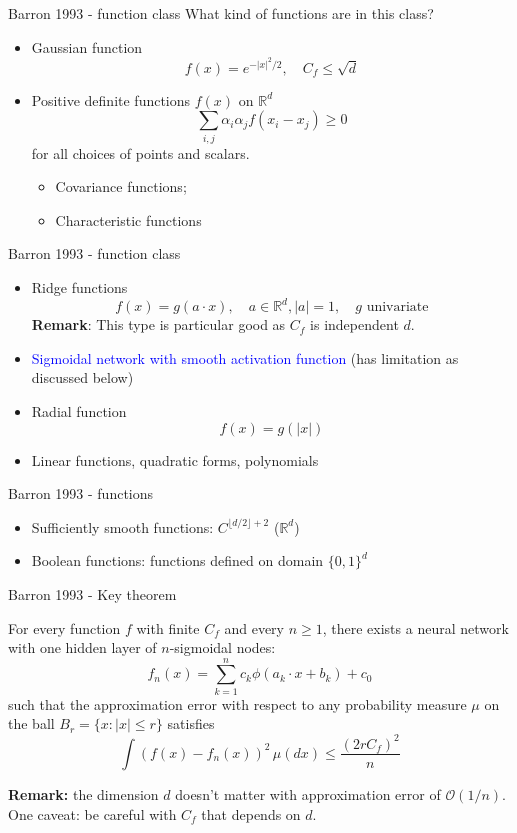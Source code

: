 \documentclass[aspectratio=169]{beamer} %
\begin{document}
\begin{frame}{Barron 1993 - function class}
What kind of functions are in this class?
\begin{itemize}
    \item Gaussian function
    $$
    f(x) = e^{-|x|^2/2},\quad C_f\le \sqrt{d}
    $$
    \item Positive definite functions $f(x)$ on $\mathbb{R}^d$
    $$
    \sum_{i,j} \alpha_i\alpha_j f(x_i-x_j)\ge 0
    $$
    for all choices of points and scalars.
    \begin{itemize}
        \item Covariance functions; 
        \item Characteristic functions
    \end{itemize}
    
\end{itemize}
\end{frame}
\begin{frame}{Barron 1993 - function class}
\begin{itemize}
    \item Ridge functions
    $$
    f(x) = g(a\cdot x),\quad a\in\mathbb{R}^d, |a|=1, \quad g\text{ univariate}
    $$
    \textbf{Remark}: This type is particular good as $C_f$ is independent $d$.
    \item \textcolor{blue}{Sigmoidal network with smooth activation function} (has limitation as discussed below)
    \item Radial function
    $$
    f(x) = g(|x|)
    $$
    \item Linear functions, quadratic forms, polynomials
\end{itemize}
\end{frame}
\begin{frame}{Barron 1993 - functions}
\begin{itemize}
    \item Sufficiently smooth functions: $C^{\lfloor d/2\rfloor+2}$ ($\mathbb{R}^d$)
    \item Boolean functions: functions defined on domain $\{0,1\}^d$
\end{itemize}
    
\end{frame}
\begin{frame}{Barron 1993 - Key theorem}
\begin{theorem}
    For every function $f$ with finite $C_f$ and every $n\ge 1$, there exists a neural network with one hidden layer of $n$-sigmoidal nodes:
    $$
    f_n(x) = \sum_{k=1}^n c_k\phi(a_k \cdot x + b_k)+c_0
    $$
    such that the approximation error with respect to any probability measure $\mu$ on the ball $B_r = \{x: |x|\le r\}$ satisfies
    $$
    \int (f(x)-f_n(x))^2 \, \mu(dx) \le \frac{(2rC_f)^2}{n}
    $$
\end{theorem}
\textbf{Remark:} the dimension $d$ doesn't matter with  approximation error of $\mathcal{O}(1/n)$. One caveat: be careful with $C_f$ that depends on $d$.
    
\end{frame}
\end{document}
